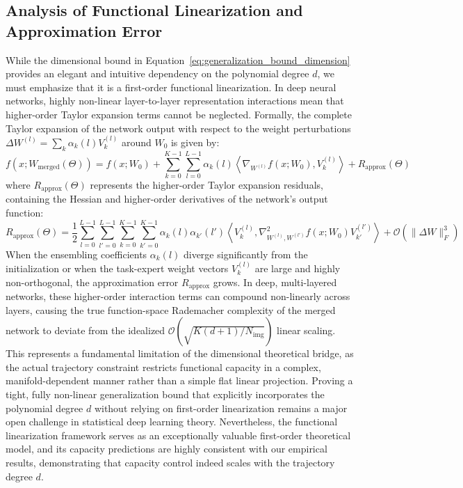 \subsection{Analysis of Functional Linearization and Approximation Error}
\label{subsec:functional_linearization_error}
While the dimensional bound in Equation~\ref{eq:generalization_bound_dimension} provides an elegant and intuitive dependency on the polynomial degree $d$, we must emphasize that it is a first-order functional linearization. In deep neural networks, highly non-linear layer-to-layer representation interactions mean that higher-order Taylor expansion terms cannot be neglected. Formally, the complete Taylor expansion of the network output with respect to the weight perturbations $\Delta W^{(l)} = \sum_{k} \alpha_k(l) V_k^{(l)}$ around $W_0$ is given by:
\begin{equation}
f(x; W_{\text{merged}}(\Theta)) = f(x; W_0) + \sum_{k=0}^{K-1} \sum_{l=0}^{L-1} \alpha_k(l) \left\langle \nabla_{W^{(l)}} f(x; W_0), V_k^{(l)} \right\rangle + R_{\text{approx}}(\Theta)
\end{equation}
where $R_{\text{approx}}(\Theta)$ represents the higher-order Taylor expansion residuals, containing the Hessian and higher-order derivatives of the network's output function:
\begin{equation}
R_{\text{approx}}(\Theta) = \frac{1}{2} \sum_{l=0}^{L-1} \sum_{l'=0}^{L-1} \sum_{k=0}^{K-1} \sum_{k'=0}^{K-1} \alpha_k(l) \alpha_{k'}(l') \left\langle V_k^{(l)}, \nabla^2_{W^{(l)}, W^{(l')}} f(x; W_0) V_{k'}^{(l')} \right\rangle + \mathcal{O}(\|\Delta W\|_F^3)
\end{equation}
When the ensembling coefficients $\alpha_k(l)$ diverge significantly from the initialization or when the task-expert weight vectors $V_k^{(l)}$ are large and highly non-orthogonal, the approximation error $R_{\text{approx}}$ grows. In deep, multi-layered networks, these higher-order interaction terms can compound non-linearly across layers, causing the true function-space Rademacher complexity of the merged network to deviate from the idealized $\mathcal{O}(\sqrt{K(d+1)/N_{\text{img}}})$ linear scaling. This represents a fundamental limitation of the dimensional theoretical bridge, as the actual trajectory constraint restricts functional capacity in a complex, manifold-dependent manner rather than a simple flat linear projection. Proving a tight, fully non-linear generalization bound that explicitly incorporates the polynomial degree $d$ without relying on first-order linearization remains a major open challenge in statistical deep learning theory. Nevertheless, the functional linearization framework serves as an exceptionally valuable first-order theoretical model, and its capacity predictions are highly consistent with our empirical results, demonstrating that capacity control indeed scales with the trajectory degree $d$.

